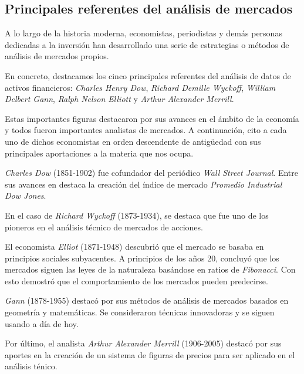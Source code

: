 \subsection{Principales referentes del análisis de mercados}

A lo largo de la historia moderna, economistas, periodistas y demás personas dedicadas a la inversión han desarrollado una serie de estrategias o métodos de análisis de mercados propios. \newline

En concreto, destacamos los cinco principales referentes del análisis de datos de activos financieros: \textit{Charles Henry Dow}, \textit{Richard Demille Wyckoff}, \textit{William Delbert Gann}, \textit{Ralph Nelson Elliott} y \textit{Arthur Alexander Merrill}. \newline

Estas importantes figuras destacaron por sus avances en el ámbito de la economía y todos fueron importantes analistas de mercados. A continuación, cito a cada uno de dichos economistas en orden descendente de antigüedad con sus principales aportaciones a la materia que nos ocupa. \newline

\textit{Charles Dow} (1851-1902) fue cofundador del periódico \textit{Wall Street Journal}. Entre sus avances en destaca la creación del índice de mercado \textit{Promedio Industrial Dow Jones}. \newline

En el caso de \textit{Richard Wyckoff} (1873-1934), se destaca que fue uno de los pioneros en el análisis técnico de mercados de acciones. \newline

El economista \textit{Elliot} (1871-1948) descubrió que el mercado se basaba en principios sociales subyacentes. A principios de los años 20, concluyó que los mercados siguen las leyes de la naturaleza basándose en ratios de \textit{Fibonacci}. Con esto demostró que el comportamiento de los mercados pueden predecirse.  \newline

\textit{Gann} (1878-1955) destacó por sus métodos de análisis de mercados basados en geometría y matemáticas. Se consideraron técnicas innovadoras y se siguen usando a día de hoy. \newline

Por último, el analista \textit{Arthur Alexander Merrill} (1906-2005) destacó por sus aportes en la creación de un sistema de figuras de precios para ser aplicado en el análisis ténico. \newline

